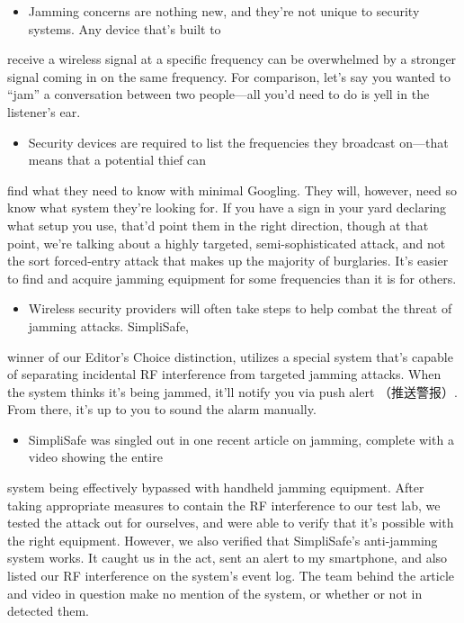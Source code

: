 \documentclass[UTF8,11pt]{ctexart}
\begin{document}
\begin{itemize}[leftmargin=2em,itemsep=.2em,topsep=.4em]\item[D.] Jamming concerns are nothing new, and they're not unique to security systems. Any device that's built to
\end{itemize}

receive a wireless signal at a specific frequency can be overwhelmed by a stronger signal coming in on the same frequency. For comparison, let's say you wanted to “jam” a conversation between two people—all you'd need to do is yell in the listener's ear.


\begin{itemize}[leftmargin=2em,itemsep=.2em,topsep=.4em]\item[E.] Security devices are required to list the frequencies they broadcast on—that means that a potential thief can
\end{itemize}

find what they need to know with minimal Googling. They will, however, need so know what system they're looking for. If you have a sign in your yard declaring what setup you use, that'd point them in the right direction, though at that point, we're talking about a highly targeted, semi-sophisticated attack, and not the sort forced-entry attack that makes up the majority of burglaries. It's easier to find and acquire jamming equipment for some frequencies than it is for others.


\begin{itemize}[leftmargin=2em,itemsep=.2em,topsep=.4em]\item[F.] Wireless security providers will often take steps to help combat the threat of jamming attacks. SimpliSafe,
\end{itemize}

winner of our Editor's Choice distinction, utilizes a special system that's capable of separating incidental RF interference from targeted jamming attacks. When the system thinks it's being jammed, it'll notify you via push alert （推送警报）. From there, it's up to you to sound the alarm manually.


\begin{itemize}[leftmargin=2em,itemsep=.2em,topsep=.4em]\item[G.] SimpliSafe was singled out in one recent article on jamming, complete with a video showing the entire
\end{itemize}

system being effectively bypassed with handheld jamming equipment. After taking appropriate measures to contain the RF interference to our test lab, we tested the attack out for ourselves, and were able to verify that it's possible with the right equipment. However, we also verified that SimpliSafe's anti-jamming system works. It caught us in the act, sent an alert to my smartphone, and also listed our RF interference on the system's event log. The team behind the article and video in question make no mention of the system, or whether or not in detected them.
\end{document}
